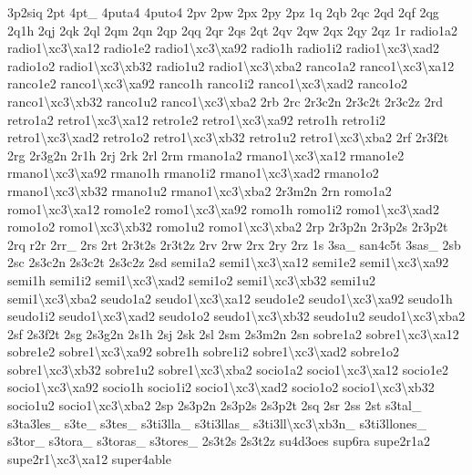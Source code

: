 \begin{DoxyCompactItemize}
3p2siq 2pt 4pt\-\_\- 4puta4 4puto4 2pv 2pw 2px 2py 2pz 1q 2qb 2qc 2qd 2qf 2qg 2q1h 2qj 2qk 2ql 2qm 2qn 2qp 2qq 2qr 2qs 2qt 2qv 2qw 2qx 2qy 2qz 1r radio1a2 radio1\textbackslash{}xc3\textbackslash{}xa12 radio1e2 radio1\textbackslash{}xc3\textbackslash{}xa92 radio1h radio1i2 radio1\textbackslash{}xc3\textbackslash{}xad2 radio1o2 radio1\textbackslash{}xc3\textbackslash{}xb32 radio1u2 radio1\textbackslash{}xc3\textbackslash{}xba2 ranco1a2 ranco1\textbackslash{}xc3\textbackslash{}xa12 ranco1e2 ranco1\textbackslash{}xc3\textbackslash{}xa92 ranco1h ranco1i2 ranco1\textbackslash{}xc3\textbackslash{}xad2 ranco1o2 ranco1\textbackslash{}xc3\textbackslash{}xb32 ranco1u2 ranco1\textbackslash{}xc3\textbackslash{}xba2 2rb 2rc 2r3c2n 2r3c2t 2r3c2z 2rd retro1a2 retro1\textbackslash{}xc3\textbackslash{}xa12 retro1e2 retro1\textbackslash{}xc3\textbackslash{}xa92 retro1h retro1i2 retro1\textbackslash{}xc3\textbackslash{}xad2 retro1o2 retro1\textbackslash{}xc3\textbackslash{}xb32 retro1u2 retro1\textbackslash{}xc3\textbackslash{}xba2 2rf 2r3f2t 2rg 2r3g2n 2r1h 2rj 2rk 2rl 2rm rmano1a2 rmano1\textbackslash{}xc3\textbackslash{}xa12 rmano1e2 rmano1\textbackslash{}xc3\textbackslash{}xa92 rmano1h rmano1i2 rmano1\textbackslash{}xc3\textbackslash{}xad2 rmano1o2 rmano1\textbackslash{}xc3\textbackslash{}xb32 rmano1u2 rmano1\textbackslash{}xc3\textbackslash{}xba2 2r3m2n 2rn romo1a2 romo1\textbackslash{}xc3\textbackslash{}xa12 romo1e2 romo1\textbackslash{}xc3\textbackslash{}xa92 romo1h romo1i2 romo1\textbackslash{}xc3\textbackslash{}xad2 romo1o2 romo1\textbackslash{}xc3\textbackslash{}xb32 romo1u2 romo1\textbackslash{}xc3\textbackslash{}xba2 2rp 2r3p2n 2r3p2s 2r3p2t 2rq r2r 2rr\-\_\- 2rs 2rt 2r3t2s 2r3t2z 2rv 2rw 2rx 2ry 2rz 1s 3sa\-\_\- san4c5t 3sas\-\_\- 2sb 2sc 2s3c2n 2s3c2t 2s3c2z 2sd semi1a2 semi1\textbackslash{}xc3\textbackslash{}xa12 semi1e2 semi1\textbackslash{}xc3\textbackslash{}xa92 semi1h semi1i2 semi1\textbackslash{}xc3\textbackslash{}xad2 semi1o2 semi1\textbackslash{}xc3\textbackslash{}xb32 semi1u2 semi1\textbackslash{}xc3\textbackslash{}xba2 seudo1a2 seudo1\textbackslash{}xc3\textbackslash{}xa12 seudo1e2 seudo1\textbackslash{}xc3\textbackslash{}xa92 seudo1h seudo1i2 seudo1\textbackslash{}xc3\textbackslash{}xad2 seudo1o2 seudo1\textbackslash{}xc3\textbackslash{}xb32 seudo1u2 seudo1\textbackslash{}xc3\textbackslash{}xba2 2sf 2s3f2t 2sg 2s3g2n 2s1h 2sj 2sk 2sl 2sm 2s3m2n 2sn sobre1a2 sobre1\textbackslash{}xc3\textbackslash{}xa12 sobre1e2 sobre1\textbackslash{}xc3\textbackslash{}xa92 sobre1h sobre1i2 sobre1\textbackslash{}xc3\textbackslash{}xad2 sobre1o2 sobre1\textbackslash{}xc3\textbackslash{}xb32 sobre1u2 sobre1\textbackslash{}xc3\textbackslash{}xba2 socio1a2 socio1\textbackslash{}xc3\textbackslash{}xa12 socio1e2 socio1\textbackslash{}xc3\textbackslash{}xa92 socio1h socio1i2 socio1\textbackslash{}xc3\textbackslash{}xad2 socio1o2 socio1\textbackslash{}xc3\textbackslash{}xb32 socio1u2 socio1\textbackslash{}xc3\textbackslash{}xba2 2sp 2s3p2n 2s3p2s 2s3p2t 2sq 2sr 2ss 2st s3tal\-\_\- s3ta3les\-\_\- s3te\-\_\- s3tes\-\_\- s3ti3lla\-\_\- s3ti3llas\-\_\- s3ti3ll\textbackslash{}xc3\textbackslash{}xb3n\-\_\- s3ti3llones\-\_\- s3tor\-\_\- s3tora\-\_\- s3toras\-\_\- s3tores\-\_\- 2s3t2s 2s3t2z su4d3oes sup6ra supe2r1a2 supe2r1\textbackslash{}xc3\textbackslash{}xa12 super4able 
\end{DoxyCompactItemize}

